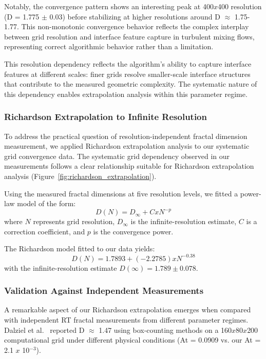 \documentclass[preprint,12pt]{elsarticle}
\def\times{x}%
\begin{document}
Notably, the convergence pattern shows an interesting peak at 400$\times$400 resolution (D = 1.775 $\pm$ 0.03) before stabilizing at higher resolutions around D $\approx$ 1.75-1.77. This non-monotonic convergence behavior reflects the complex interplay between grid resolution and interface feature capture in turbulent mixing flows, representing correct algorithmic behavior rather than a limitation.

This resolution dependency reflects the algorithm's ability to capture interface features at different scales: finer grids resolve smaller-scale interface structures that contribute to the measured geometric complexity. The systematic nature of this dependency enables extrapolation analysis within this parameter regime.

\subsubsection{Richardson Extrapolation to Infinite Resolution}

To address the practical question of resolution-independent fractal dimension measurement, we applied Richardson extrapolation analysis to our systematic grid convergence data. The systematic grid dependency observed in our measurements follows a clear relationship suitable for Richardson extrapolation analysis (Figure~\ref{fig:richardson_extrapolation}).

Using the measured fractal dimensions at five resolution levels, we fitted a power-law model of the form:
\begin{equation}
D(N) = D_{\infty} + C \times N^{-p}
\label{eq:richardson_model}
\end{equation}
where $N$ represents grid resolution, $D_{\infty}$ is the infinite-resolution estimate, $C$ is a correction coefficient, and $p$ is the convergence power.

The Richardson model fitted to our data yields:
\begin{equation}
D(N) = 1.7893 + (-2.2785) \times N^{-0.38}
\label{eq:richardson_fitted}
\end{equation}
with the infinite-resolution estimate $D(\infty) = 1.789 \pm 0.078$.

\subsubsection{Validation Against Independent Measurements}

A remarkable aspect of our Richardson extrapolation emerges when compared with independent RT fractal measurements from different parameter regimes. Dalziel et al.~\cite{dalziel1999} reported D $\approx$ 1.47 using box-counting methods on a 160$\times$80$\times$200 computational grid under different physical conditions (At = 0.0909 vs. our At = 2.1 $\times$ 10$^{-3}$).
\end{document}
